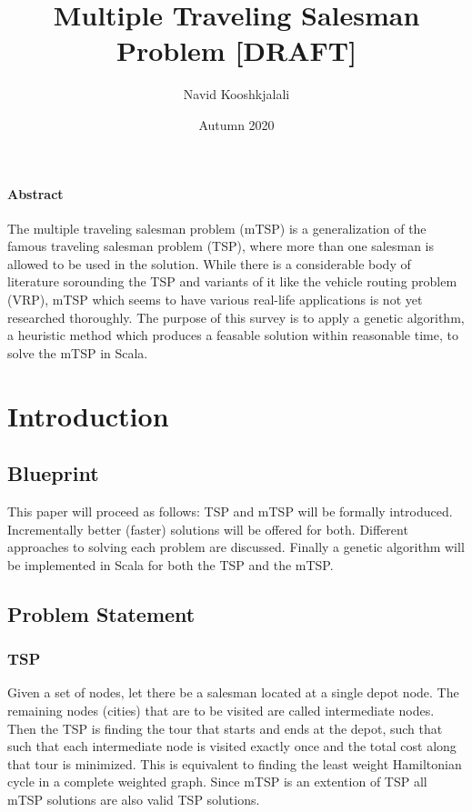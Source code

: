 \documentclass[11pt]{article}
\title{Multiple Traveling Salesman Problem [DRAFT]}
\author{Navid Kooshkjalali}
\date{Autumn 2020}
\begin{document}
\maketitle
\vspace*{2cm}
\paragraph{Abstract}
The multiple traveling salesman problem (mTSP) is a generalization of the famous traveling salesman problem (TSP), where more than one salesman is allowed to be used in the solution. While there is a considerable body of literature sorounding the TSP and variants of it like the vehicle routing problem (VRP), mTSP which seems to have various real-life applications is not yet researched thoroughly. The purpose of this survey is to apply a genetic algorithm, a heuristic method which produces a feasable solution within reasonable time, to solve the mTSP in Scala.

\newpage
\section{Introduction}
\subsection{Blueprint}
This paper will proceed as follows: TSP and mTSP will be formally introduced. Incrementally better (faster) solutions will be offered for both. Different approaches to solving each problem are discussed. Finally a genetic algorithm will be implemented in Scala for both the TSP and the mTSP.
\subsection{Problem Statement}

\subsubsection{TSP}
Given a set of nodes, let there be a salesman located at a single depot node. The remaining nodes (cities) that are to be visited are called intermediate nodes. Then the TSP is finding the tour that starts and ends at the depot, such that such that each intermediate node is visited exactly once and the total cost along that tour is minimized. This is equivalent to finding the least weight Hamiltonian cycle in a complete weighted graph. Since mTSP is an extention of TSP all mTSP solutions are also valid TSP solutions.
\end{document}
